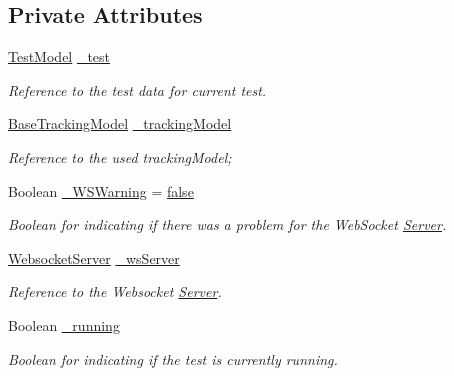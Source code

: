 \subsection*{Private Attributes}
\begin{DoxyCompactItemize}
\item 
\hyperlink{class_web_analyzer_1_1_models_1_1_data_model_1_1_test_model}{Test\+Model} \hyperlink{class_web_analyzer_1_1_controller_1_1_test_controller_a6084bcc401d37f7f8861fc0e9fb771b6}{\+\_\+test}
\begin{DoxyCompactList}\small\item\em Reference to the test data for current test. \end{DoxyCompactList}\item 
\hyperlink{class_web_analyzer_1_1_models_1_1_base_1_1_base_tracking_model}{Base\+Tracking\+Model} \hyperlink{class_web_analyzer_1_1_controller_1_1_test_controller_a17ba537e2a4dc341401b513ca2afbcce}{\+\_\+tracking\+Model}
\begin{DoxyCompactList}\small\item\em Reference to the used tracking\+Model; \end{DoxyCompactList}\item 
Boolean \hyperlink{class_web_analyzer_1_1_controller_1_1_test_controller_a517bab0ee0c22871788bd498de86c27e}{\+\_\+\+W\+S\+Warning} = \hyperlink{_u_i_2_h_t_m_l_resources_2js_2src_2export_8js_ae6c865df784842196d411c1466b01686}{false}
\begin{DoxyCompactList}\small\item\em Boolean for indicating if there was a problem for the Web\+Socket \hyperlink{namespace_web_analyzer_1_1_server}{Server}. \end{DoxyCompactList}\item 
\hyperlink{class_web_analyzer_1_1_server_1_1_websocket_server}{Websocket\+Server} \hyperlink{class_web_analyzer_1_1_controller_1_1_test_controller_aeb605e9f2ad9c53af52fb846fe2a98a6}{\+\_\+ws\+Server}
\begin{DoxyCompactList}\small\item\em Reference to the Websocket \hyperlink{namespace_web_analyzer_1_1_server}{Server}. \end{DoxyCompactList}\item 
Boolean \hyperlink{class_web_analyzer_1_1_controller_1_1_test_controller_a49aaaa975ccbeedcd52fb03288cea3ef}{\+\_\+running}
\begin{DoxyCompactList}\small\item\em Boolean for indicating if the test is currently running. \end{DoxyCompactList}\item 

\end{DoxyCompactItemize}
